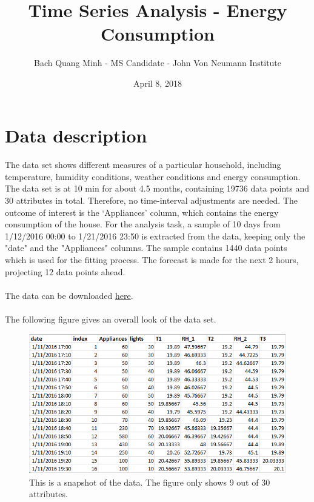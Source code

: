 \documentclass[12pt]{article}
\title{Time Series Analysis - Energy Consumption}
\date{April 8, 2018}
\author{Bach Quang Minh - MS Candidate - John Von Neumann Institute}
\begin{document}
\maketitle
{}

\newpage
\tableofcontents

\newpage
{}

\section{Data description}
\paragraph{}
The data set shows different measures of a particular household, including temperature, humidity conditions, weather conditions and energy consumption.
The data set is at 10 min for about 4.5 months, containing 19736 data points and 30 attributes in total.
Therefore, no time-interval adjustments are needed.
The outcome of interest is the ‘Appliances’ column, which contains the energy consumption of the house.
For the analysis task, a sample of 10 days from 1/12/2016 00:00 to 1/21/2016 23:50 is extracted from the data, keeping only the "date" and the "Appliances" columns.
The sample contains 1440 data points which is used for the fitting process. 
The forecast is made for the next 2 hours, projecting 12 data points ahead.

\paragraph{}
The data can be downloaded 
\href{https://archive.ics.uci.edu/ml/datasets/Appliances+energy+prediction#}{here}.

\paragraph{}
The following figure gives an overall look of the data set. 
\begin{figure}[H]
  \includegraphics[width=\linewidth]{figure1.png}
  \caption{This is a snapshot of the data. The figure only shows 9 out of 30 attributes.}
  \label{fig:figure1}
\end{figure}
\end{document}
